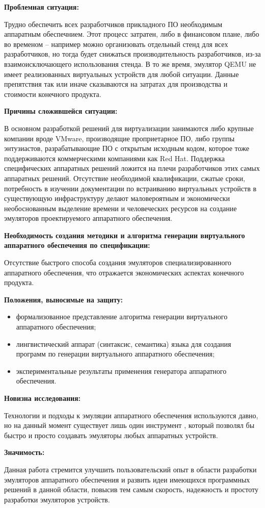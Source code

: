 \textbf{Проблемная ситуация:}

Трудно обеспечить всех разработчиков прикладного ПО необходимым
аппаратным обеспечнием. Этот процесс затратен, либо в финансовом плане,
либо во временом -- например можно организовать отдельный стенд для
всех разработчиков, но тогда будет снижаться производительность
разработчиков, из-за взаимоисключающего использования стенда.
В то же время, эмулятор QEMU не имеет реализованных виртуальных
устройств для любой ситуации. Данные препятствия так или иначе
сказываются на затратах для производства и стоимости конечного продукта.

\textbf{Причины сложившейся ситуации:}

В основном разработкой решений для виртуализации занимаются либо крупные компании вроде VMware, производящие
проприетарное ПО, либо группы энтузиастов, разрабатывающие ПО с открытым исходным кодом, которое
тоже поддерживаются коммерческими компаниями как Red Hat. Поддержка специфических аппаратных решений
ложится на плечи разработчиков этих самых аппаратных решений. Отсутствие необходимой квалификации,
сжатые сроки, потребность в изучении документации по встраиванию виртуальных устройств в существующую
инфраструктуру делают маловероятным и экономически необоснованным выделение времени и
человеческих ресурсов на создание эмуляторов проектируемого аппаратного обеспечения.

\textbf{Необходимость создания методики и алгоритма генерации виртуального аппаратного
обеспечения по спецификации:}

Отсутствие быстрого способа создания эмуляторов специализированного аппаратного обеспечения, что отражается
экономических аспектах конечного продукта.

\textbf{Положения, выносимые на защиту:}
\begin{itemize}
    \item формализованное представление алгоритма генерации виртуального аппаратного обеспечения;
    \item лингвистический аппарат (синтаксис, семантика) языка для создания программ по генерации виртуального
        аппаратного обеспечения;
    \item экспериментальные результаты применения генератора аппаратного обеспечения.
\end{itemize}

\textbf{Новизна исследования:}

Технологии и подходы к эмуляции аппаратного обеспечения используются давно,
но на данный момент существует лишь один инструмент \cite{imposters}, который позволял
бы быстро и просто создавать эмуляторы любых аппаратных устройств.


\textbf{Значимость:}

Данная работа стремится улучшить пользовательский опыт в области разработки эмуляторов
аппаратного обеспечения и развить идеи имеющихся программных решений в данной области,
повысив тем самым скорость, надежность и простоту разработки эмуляторов устройств.
